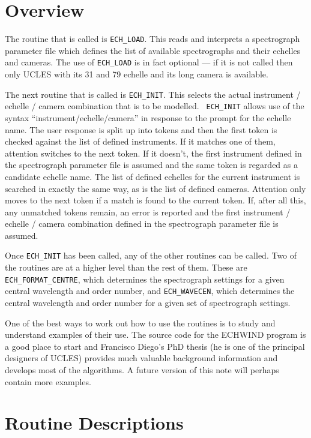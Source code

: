 \section{Overview}

The routine that is called is {\tt ECH\_LOAD}. This reads and interprets a
spectrograph parameter file which defines the list of available spectrographs
and their echelles and cameras. The use of {\tt ECH\_LOAD} is in fact optional
--- if it is not called then only UCLES with its 31 and 79 echelle and its long
camera is available.

The next routine that is called is {\tt ECH\_INIT}. This selects the actual
instrument / echelle / camera combination that is to be modelled. {\tt
ECH\_INIT} allows use of the syntax ``instrument/echelle/camera'' in response
to the prompt for the echelle name. The user response is split up into tokens
and then the first token is checked against the list of defined instruments. If
it matches one of them, attention switches to the next token. If it doesn't,
the first instrument defined in the spectrograph parameter file is assumed and
the same token is regarded as a candidate echelle name. The list of defined
echelles for the current instrument is searched in exactly the same way, as is
the list of defined cameras. Attention only moves to the next token if a match
is found to the current token. If, after all this, any unmatched tokens remain,
an error is reported and the first instrument /  echelle / camera combination
defined in the spectrograph parameter file is assumed.

Once {\tt ECH\_INIT} has been called, any of the other routines can be called.
Two of the routines are at a higher level than the rest of them. These are {\tt
ECH\_FORMAT\_CENTRE}, which determines the spectrograph settings for a given
central wavelength and order number, and {\tt ECH\_WAVECEN}, which determines
the central wavelength and order number for a given set of spectrograph
settings.

One of the best ways to work out how to use the routines is to study and
understand examples of their use. The source code for the ECHWIND program is a
good place to start and Francisco Diego's PhD thesis (he is one of the
principal designers of UCLES) provides much valuable background information and
develops most of the algorithms. A future version of this note will perhaps
contain more examples.

\appendix
\section{Routine Descriptions}

